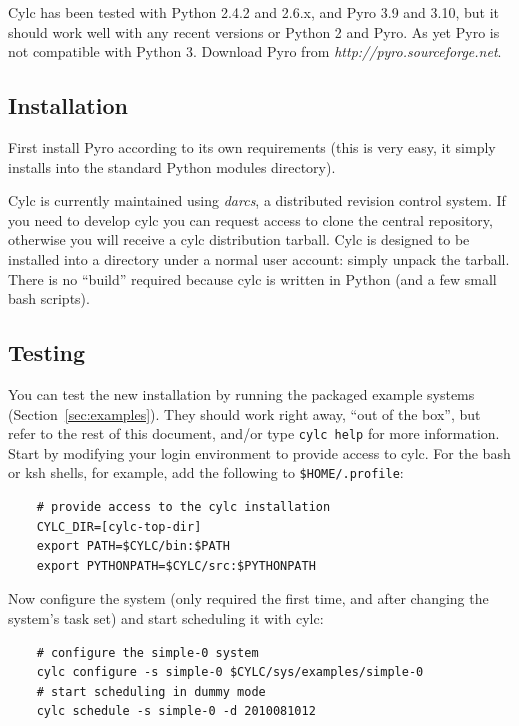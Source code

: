 \documentclass[11pt,a4paper]{article}
\begin{document}
Cylc has been tested with Python 2.4.2 and 2.6.x, and Pyro 3.9 and 3.10,
but it should work well with any recent versions or Python 2 and Pyro.
As yet Pyro is not compatible with Python 3. Download Pyro from {\em
http://pyro.sourceforge.net}. 

\subsection{Installation}

First install Pyro according to its own requirements (this is very easy,
it simply installs into the standard Python modules directory).

Cylc is currently maintained using {\em darcs}, a distributed revision
control system. If you need to develop cylc you can request access to
clone the central repository, otherwise you will receive a cylc
distribution tarball. Cylc is designed to be installed into a directory
under a normal user account: simply unpack the tarball. There is no
``build'' required because cylc is written in Python (and a few small 
bash scripts).

\subsection{Testing}

You can test the new installation by running the packaged example
systems (Section~\ref{sec:examples}). They should work right away, ``out
of the box'', but refer to the rest of this document, and/or type
\lstinline=cylc help= for more information.  Start by modifying your
login environment to provide access to cylc.  For the bash or ksh
shells, for example, add the following to \lstinline=$HOME/.profile=: 

\lstset{language=bash}

\begin{lstlisting}
    # provide access to the cylc installation
    CYLC_DIR=[cylc-top-dir]
    export PATH=$CYLC/bin:$PATH
    export PYTHONPATH=$CYLC/src:$PYTHONPATH
\end{lstlisting}

Now configure the system (only required the first time, and after
changing the system's task set) and start scheduling it with cylc:

\begin{lstlisting}
    # configure the simple-0 system
    cylc configure -s simple-0 $CYLC/sys/examples/simple-0
    # start scheduling in dummy mode
    cylc schedule -s simple-0 -d 2010081012
\end{lstlisting}
\end{document}
